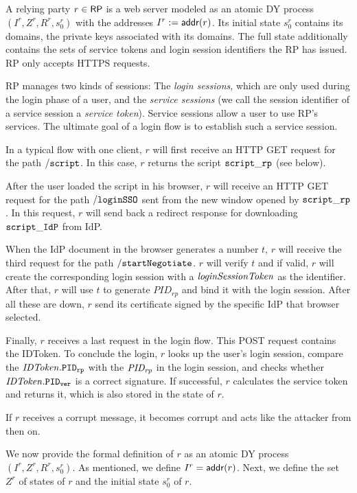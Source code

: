 \documentclass[letterpaper,onecolumn,10pt]{article}
\begin{document}
A relying party $r \in \mathsf{RP}$ is a web server modeled as an atomic
DY process $(I^r, Z^r, R^r, s^r_0)$ with the addresses $I^r :=
\mathsf{addr}(r)$. Its initial state $s^r_0$ contains its domains,
the private keys associated with its domains.
The full state additionally contains the sets of service tokens and login 
session identifiers the RP has issued. RP only accepts HTTPS requests.

RP manages two kinds of sessions: The \emph{login sessions}, which are
only used during the login phase of a user, and the \emph{service
  sessions} (we call the session identifier of a service session a
\emph{service token}). Service sessions allow a user to use RP's
services. The ultimate goal of a login flow is to establish such a
service session.

In a typical flow with one client, $r$ will first receive an HTTP GET
request for the path $\mathtt{/script}$. In this case, $r$ returns the script
$\mathtt{script\_rp}$ (see below).

After the user loaded the script in his browser, $r$ will receive an 
HTTP GET request for the path $\mathtt{/loginSSO}$ sent from the new window opened
by $\mathtt{script\_rp}$. In this request, $r$ will send back a redirect response  
for downloading $\mathtt{script\_IdP}$ from IdP.

When the IdP document in the browser generates a number $t$,
$r$ will receive the third request for the path $\mathtt{/startNegotiate}$.
$r$ will verify $t$ and if valid, $r$ will create the corresponding 
login session with a $\mathit{loginSessionToken}$ as the identifier. After that,
$r$ will use $t$ to generate $PID_{rp}$ and bind it with the login session.
After all these are down, $r$ send its certificate signed by the specific IdP that browser selected.

Finally, $r$ receives a last request in the login flow. This POST request 
contains the IDToken. To conclude the login, $r$ looks up the user's login session, 
compare the $\mathit{IDToken}.\mathtt{PID_{rp}}$ with the $\mathit{PID_{rp}}$ in the login session, and checks 
whether $\mathit{IDToken}.\mathtt{PID_{ver}}$ is a correct signature. If successful, $r$ calculates the 
service token and returns it, which is also stored in the state of $r$.

If $r$ receives a corrupt message, it becomes corrupt and acts like
the attacker from then on.

We now provide the formal definition of $r$ as an atomic DY process
$(I^r, Z^r, R^r, s^r_0)$. As mentioned, we define $I^r =
\mathsf{addr}(r)$. Next, we define the set $Z^r$ of states of
$r$ and the initial state $s^r_0$ of $r$.
\end{document}
